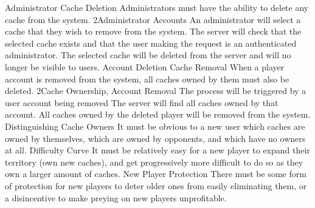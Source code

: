 			{Administrator Cache Deletion}
			{Administrators must have the ability to delete any cache from the
			system.}
			{2}{Administrator Accounts}
			{An administrator will select a cache that they wish to remove from
			the system.}
			{The server will check that the selected cache exists and that the
			user making the request is an authenticated administrator.}
			{The selected cache will be deleted from the server and will no
			longer be visible to users.}
		\funcreq %
			{Account Deletion Cache Removal}
			{When a player account is removed from the system, all caches owned
			by them must also be deleted.}
			{2}{Cache Ownership, Account Removal}
			{The process will be triggered by a user account being removed}
			{The server will find all caches owned by that account.}
			{All caches owned by the deleted player will be removed from the
			system.}
		\nonfuncreq %
			{Distinguishing Cache Owners}
			{It must be obvious to a new user which caches are owned by
			themselves, which are owned by opponents, and which have no owners
			at all.}
		\nonfuncreq %
			{Difficulty Curve}
			{It must be relatively easy for a new player to expand their
			territory (own new caches), and get progressively more difficult to
			do so as they own a larger amount of caches.}
		\nonfuncreq %
			{New Player Protection}
			{There must be some form of protection for new players to deter
			older ones from easily eliminating them, or a disincentive to make
			preying on new players unprofitable.}
